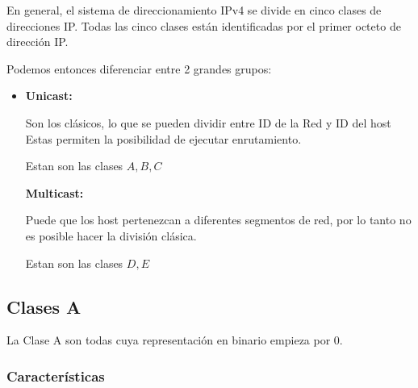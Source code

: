 \documentclass[12pt, fleqn]{report}                             %
\theoremstyle{break}                                            %
\begin{document}
            En general, el sistema de direccionamiento IPv4 se divide en cinco clases de direcciones IP.
            Todas las cinco clases están identificadas por el primer octeto de dirección IP.

            Podemos entonces diferenciar entre 2 grandes grupos:
            \begin{itemize}
                \item 
                    \textbf{Unicast:}

                        Son los clásicos, lo que se pueden dividir entre ID de la Red y ID del host
                        Estas permiten la posibilidad de ejecutar enrutamiento.

                        Estan son las clases $A, B, C$

                    \textbf{Multicast:}

                        Puede que los host pertenezcan a diferentes segmentos de red, por lo tanto
                        no es posible hacer la división clásica.
                        
                        Estan son las clases $D, E$


            \end{itemize}

            \clearpage
            \subsection{Clases A}

                La Clase A son todas cuya representación en binario empieza por $0$.

                \subsubsection{Características}
                
\end{document}
